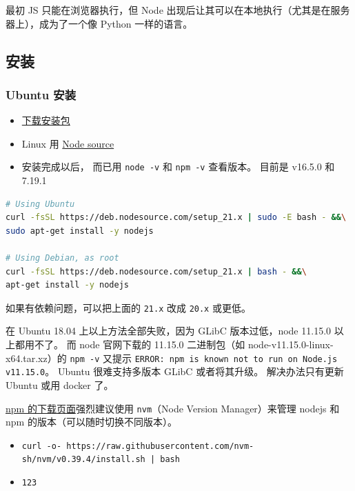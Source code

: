

最初 JS 只能在浏览器执行，但 Node 出现后让其可以在本地执行（尤其是在服务器上），成为了一个像 Python 一样的语言。

\subsection{安装}
\subsubsection{Ubuntu 安装}
\begin{itemize}
\item \href{https://nodejs.org/en/download/package-manager/}{下载安装包}
\item Linux 用 \href{https://github.com/nodesource/distributions/blob/master/README.md#installation-instructions}{Node source}
\item 安装完成以后， 而已用 \verb`node -v` 和 \verb`npm -v` 查看版本。 目前是 v16.5.0 和 7.19.1
\end{itemize}
\begin{lstlisting}[language=bash]
# Using Ubuntu
curl -fsSL https://deb.nodesource.com/setup_21.x | sudo -E bash - &&\
sudo apt-get install -y nodejs

# Using Debian, as root
curl -fsSL https://deb.nodesource.com/setup_21.x | bash - &&\
apt-get install -y nodejs
\end{lstlisting}
如果有依赖问题，可以把上面的 \verb`21.x` 改成 \verb`20.x` 或更低。

在 Ubuntu 18.04 上以上方法全部失败，因为 GLibC 版本过低，node 11.15.0 以上都用不了。 而 node 官网下载的 11.15.0 二进制包（如 node-v11.15.0-linux-x64.tar.xz）的 \verb`npm -v` 又提示 \verb`ERROR: npm is known not to run on Node.js v11.15.0`。 Ubuntu 很难支持多版本 GLibC 或者将其升级。 解决办法只有更新 Ubuntu 或用 docker 了。

\href{https://docs.npmjs.com/downloading-and-installing-node-js-and-npm}{npm 的下载页面}强烈建议使用 \verb`nvm`（Node Version Manager）来管理 nodejs 和 npm 的版本（可以随时切换不同版本）。
\begin{itemize}
\item \verb`curl -o- https://raw.githubusercontent.com/nvm-sh/nvm/v0.39.4/install.sh | bash`
\item \verb`123`
\end{itemize}


